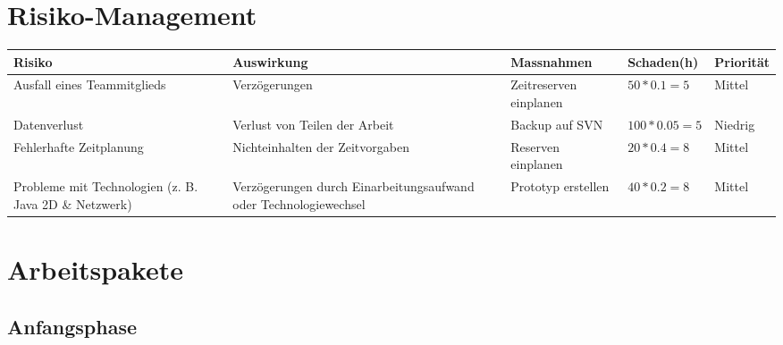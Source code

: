 \documentclass[a4paper,12pt,halfparskip,DIV14]{scrreprt}
\begin{document}
\section{Risiko-Management}

\begin{tabular}{@{} p{2.7cm} p{3.6cm} p{4cm} l l @{}}
\toprule
\textbf{Risiko} &
\textbf{Auswirkung} &
\textbf{Massnahmen} &
\textbf{Schaden\footnotemark (h)} &
\textbf{Priorität} \\
\midrule
Ausfall eines Teammitglieds & Verzögerungen & Zeitreserven einplanen  & $50 * 0.1 = 5$ & Mittel \\
\midrule
Datenverlust & Verlust von Teilen der Arbeit & Backup auf SVN & $100 * 0.05 = 5$ & Niedrig \\
\midrule
Fehlerhafte Zeitplanung & Nichteinhalten der Zeitvorgaben & Reserven einplanen & $20 * 0.4 = 8$ & Mittel \\
\midrule
Probleme mit Technologien (z. B. Java 2D \&  Netzwerk) & Verzögerungen durch Einarbeitungsaufwand oder Technologiewechsel & Prototyp erstellen & $40 * 0.2 = 8$ & Mittel \\
\bottomrule
\end{tabular}


\section{Arbeitspakete}

\subsection{Anfangsphase}
\end{document}
